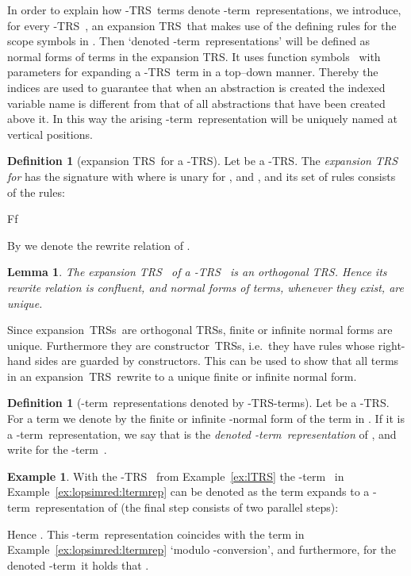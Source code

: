 \documentclass[
submission
]{dmtcs-episciences-tampered}
\newcommand{\nb}{\nobreakdash}
\newcommand{\TRS}{TRS}
\newcommand{\TRSs}{TRSs}
\newcommand{\afoscopesym}{f}
\newcommand{\afoscopecxt}{F}
\newcommand{\lambdaterm}{\nb-term}
\newcommand{\alphaconversion}{\nb-con\-ver\-sion}
\newcommand{\lTRS}{\hspace*{-0.5pt}\nb-\hspace*{-0.5pt}\TRS}
\theoremstyle{plain}
\newtheorem{lemma}[theorem]{Lemma}
\theoremstyle{definition}
\newtheorem{definition}[theorem]{Definition}
\newtheorem{example}[theorem]{Example}
\begin{document}
In order to explain how \lTRS\ terms denote \lambdaterm\ representations, we introduce, for every \lTRS~, 
an expansion \TRS\ that makes use of the defining rules for the scope symbols in . 
Then `denoted \lambdaterm\ representations' will be defined as normal forms of terms in the expansion \TRS.
It uses function symbols~ with parameters  
for expanding a \lTRS\ term in a top--down manner.
Thereby the indices  are used to guarantee that when an abstraction  is created 
the indexed variable name  is different from that of all abstractions  that have been created above it. 
In this way the arising \lambdaterm\ representation will be uniquely named at vertical positions. 


\begin{definition}[expansion \TRS\ for a \lTRS]\label{def:expandTRS}
  Let  be a \lTRS. 
  The \emph{expansion \TRS~ for }
  has the signature 
  with 
  where  is unary for , and ,
  and its set of rules  consists of the rules:
  \begin{center}
  \afoscopecxt\afoscopesym
  \end{center}
  By  we denote the rewrite relation of .
\end{definition}


\begin{lemma}\label{lem:expTRS:orthogonal:UN}
  The expansion \TRS~ 
  of a \lTRS~  
  is an orthogonal TRS.
  Hence its rewrite relation  is confluent,
  and normal forms of terms, whenever they exist, are unique.
\end{lemma}



Since expansion~\TRSs\ are orthogonal \TRSs, finite or infinite normal forms are unique.
Furthermore they are constructor~\TRSs, i.e.\ they have rules whose right-hand sides are guarded by constructors.
This can be used to show that all terms in an expansion~\TRS\ rewrite to a unique finite or infinite normal form.  






\begin{definition}[\lambdaterm\ representations denoted by \protect\lTRS\nb-terms]
  Let  be a \lTRS. 
  For a term  we denote by  
  the finite or infinite \nb-normal form of the term  in .
  If it is a \lambdaterm\ representation, we say that
   is the \emph{denoted \lambdaterm\ representation} of ,
  and write  for the \lambdaterm~.
\end{definition}

\begin{example}\label{ex:lTRS:expred}
  With the \lTRS~ from Example~\ref{ex:lTRS}
  the \lambdaterm~ in Example~\ref{ex:lopsimred:ltermrep} can be denoted
  as the term  expands 
  to a \lambdaterm\ representation of 
  (the final  step consists of two parallel  steps):

Hence
    .                         
  This \lambdaterm\ representation coincides with the term  in Example~\ref{ex:lopsimred:ltermrep}
  `modulo \alphaconversion',
  and furthermore, for the denoted \lambdaterm\ it holds that
  .
\end{example}
\end{document}
